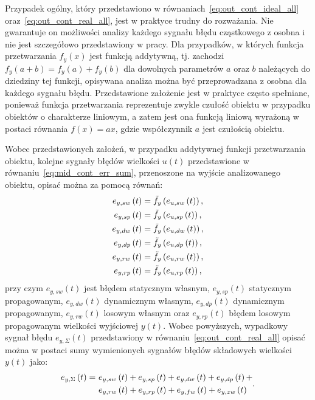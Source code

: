 Przypadek ogólny, który przedstawiono w równaniach~\eqref{eq:out_cont_ideal_all} oraz~\eqref{eq:out_cont_real_all}, jest w praktyce trudny do rozważania. Nie gwarantuje on możliwości analizy każdego sygnału błędu cząstkowego z osobna i nie jest szczegółowo przedstawiony w pracy. Dla przypadków, w których funkcja przetwarzania $f_{y}(x)$ jest funkcją addytywną, tj. zachodzi $f_{y}(a + b) = f_{y}(a) + f_{y}(b)$ dla dowolnych parametrów $a$ oraz $b$ należących do dziedziny tej funkcji, opisywana analiza można być przeprowadzana z osobna dla każdego sygnału błędu. Przedstawione założenie jest w praktyce często spełniane, ponieważ funkcja przetwarzania reprezentuje zwykle czułość obiektu w przypadku obiektów o charakterze liniowym, a zatem jest ona funkcją liniową wyrażoną w postaci równania $f(x) = ax$, gdzie współczynnik $a$ jest czułością obiektu.

Wobec przedstawionych założeń, w przypadku addytywnej funkcji przetwarzania obiektu, kolejne sygnały błędów wielkości $u(t)$ przedstawione w równaniu~\eqref{eq:mid_cont_err_sum}, przenoszone na wyjście analizowanego obiektu, opisać można za pomocą równań:
\begin{gather}
e_{y,sw} \left(t\right) = \tilde{f}_{y} \left( e_{u,sw} \left(t\right) \right) \label{eq:out_cont_err_stat_self}, \\
e_{y,sp} \left(t\right) = \tilde{f}_{y} \left( e_{u,sp} \left(t\right) \right) \label{eq:out_cont_err_stat_prop}, \\
e_{y,dw} \left(t\right) = \tilde{f}_{y} \left( e_{u,dw} \left(t\right) \right) \label{eq:out_cont_err_dyn_self}, \\
e_{y,dp} \left(t\right) = \tilde{f}_{y} \left( e_{u,dp} \left(t\right) \right) \label{eq:out_cont_err_dyn_prop}, \\
e_{y,rw} \left(t\right) = \tilde{f}_{y} \left( e_{u,rw} \left(t\right) \right) \label{eq:out_cont_err_rand_self}, \\
e_{y,rp} \left(t\right) = \tilde{f}_{y} \left( e_{u,rp} \left(t\right) \right) \label{eq:out_cont_err_rand_prop},
\end{gather}
przy czym $e_{y,sw}(t)$  jest błędem statycznym własnym, $e_{y,sp}(t)$ statycznym propagowanym, $e_{y,dw}(t)$ dynamicznym własnym, $e_{y,dp}(t)$ dynamicznym propagowanym, $e_{y,rw}(t)$ losowym własnym oraz $e_{y,rp}(t)$ błędem losowym propagowanym wielkości wyjściowej $y(t)$. Wobec powyższych, wypadkowy sygnał błędu $e_{y,\Sigma}(t)$ przedstawiony w równaniu~\eqref{eq:out_cont_real_all} opisać można w postaci sumy wymienionych sygnałów błędów składowych wielkości $y(t)$ jako:
\begin{equation}
\begin{split}
e_{y,\Sigma} \left(t\right) = ~
& e_{y,sw} \left(t\right) + e_{y,sp} \left(t\right) + e_{y,dw} \left(t\right) + e_{y,dp} \left(t\right) + \\
& e_{y,rw} \left(t\right) + e_{y,rp} \left(t\right) + e_{y,fw} \left(t\right) + e_{y,zw} \left(t\right)
\end{split}
\label{eq:out_cont_err_sum_all}.
\end{equation}

